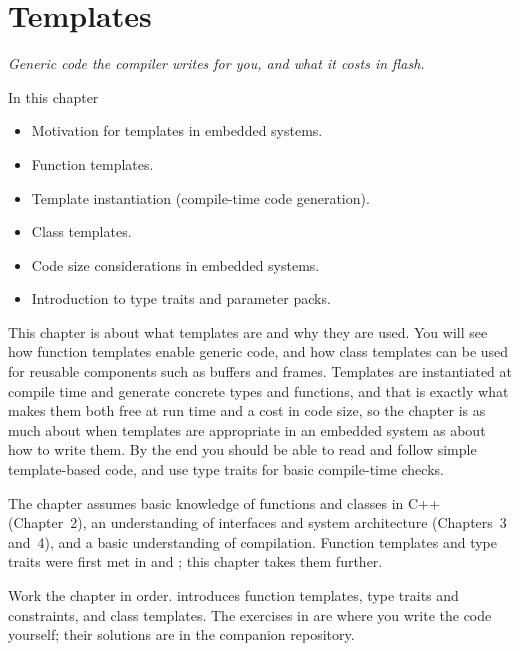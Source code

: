 
\chapter{Templates}
\label{c5:ch:templates}

{\large\itshape Generic code the compiler writes for you, and what it costs in flash.\par}

\begin{chapterbox}{In this chapter}
\begin{itemize}
  \item Motivation for templates in embedded systems.
  \item Function templates.
  \item Template instantiation (compile-time code generation).
  \item Class templates.
  \item Code size considerations in embedded systems.
  \item Introduction to type traits and parameter packs.
\end{itemize}
\end{chapterbox}

This chapter is about what templates are and why they are used. You will see how function
templates enable generic code, and how class templates can be used for reusable components such
as buffers and frames. Templates are instantiated at compile time and generate concrete types and
functions, and that is exactly what makes them both free at run time and a cost in code size, so
the chapter is as much about when templates are appropriate in an embedded system as about how to
write them. By the end you should be able to read and follow simple template-based code, and use
type traits for basic compile-time checks.

The chapter assumes basic knowledge of functions and classes in C++ (Chapter~2), an understanding
of interfaces and system architecture (Chapters~3 and~4), and a basic understanding of
compilation. Function templates and type traits were first met in  and
; this chapter takes them further.

Work the chapter in order.  introduces function templates,
 type traits and constraints, and  class templates. The
exercises in  are where you write the code yourself; their solutions are
in the companion repository.






